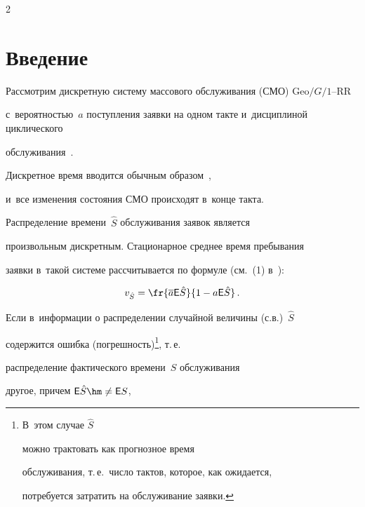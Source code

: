 \thispagestyle{headings}



\begin{multicols}{2}



\label{st\stat}



\section{Введение}





Рассмотрим дискретную систему массового обслуживания (СМО) $\mathrm{Geo}/G/1$--RR

с~вероятностью~$a$ поступления заявки на одном такте и~дисциплиной циклического

 обслуживания~\cite{Schass2}.

Дискретное время вводится обычным образом~\cite{distime},

и~все изменения состояния СМО происходят в~конце такта.

Распределение времени~$\hat{S}$ обслуживания заявок является

произвольным дискретным. Стационарное среднее время пребывания

заявки в~такой системе рассчитывается по формуле (см.~(1) в~\cite{Schass}):

\begin{equation}

\label{shassb}

v_{\hat S}= \fr{\overline{a} \mathsf{E}{\hat S}}{1- a  \mathsf{E}{\hat S}}\,.

\end{equation}


Если в~информации о распределении случайной величины (с.в.)~$\hat{S}$

содержится ошибка (погрешность)\footnote[3]{В~этом случае $\hat{S}$

можно трактовать как прогнозное время

обслуживания, т.\,е.\ число тактов, которое, как ожидается,

потребуется затратить на обслуживание заявки.}, т.\,е.\

распределение фактического времени~$S$ обслуживания

другое, причем $\mathsf{E}{\hat S}\hm\neq \mathsf{E}{S}$,


\end{multicols}
